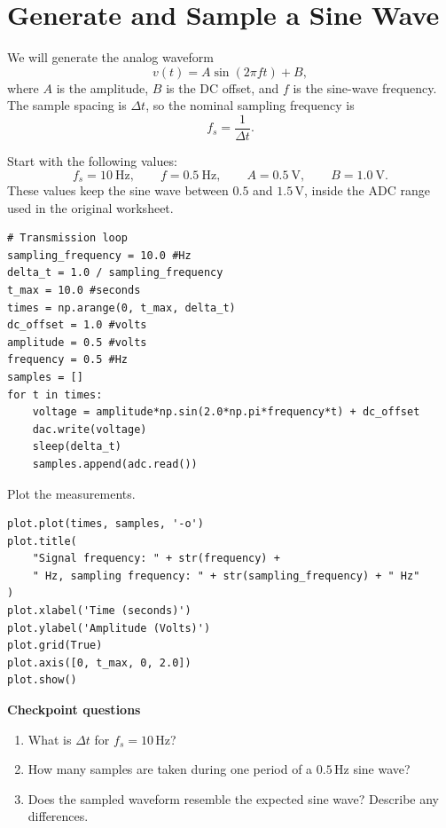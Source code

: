 \documentclass[11pt]{article}
\begin{document}
\section{Generate and Sample a Sine Wave}

We will generate the analog waveform
\begin{equation}
    v(t)=A\sin(2\pi f t)+B,
\end{equation}
where $A$ is the amplitude, $B$ is the DC offset, and $f$ is the sine-wave frequency.  The sample spacing is $\Delta t$, so the nominal sampling frequency is
\begin{equation}
    f_s=\frac{1}{\Delta t}.
\end{equation}

Start with the following values:
\begin{equation*}
    f_s=10\ \mathrm{Hz},\qquad
    f=0.5\ \mathrm{Hz},\qquad
    A=0.5\ \mathrm{V},\qquad
    B=1.0\ \mathrm{V}.
\end{equation*}
These values keep the sine wave between $0.5$ and $1.5\,$V, inside the ADC range used in the original worksheet.

\begin{lstlisting}[style=python]
# Transmission loop
sampling_frequency = 10.0 #Hz
delta_t = 1.0 / sampling_frequency
t_max = 10.0 #seconds
times = np.arange(0, t_max, delta_t)
dc_offset = 1.0 #volts
amplitude = 0.5 #volts
frequency = 0.5 #Hz
samples = []
for t in times:
    voltage = amplitude*np.sin(2.0*np.pi*frequency*t) + dc_offset
    dac.write(voltage)
    sleep(delta_t)
    samples.append(adc.read())
\end{lstlisting}

Plot the measurements.

\begin{lstlisting}[style=python]
plot.plot(times, samples, '-o')
plot.title(
    "Signal frequency: " + str(frequency) +
    " Hz, sampling frequency: " + str(sampling_frequency) + " Hz"
)
plot.xlabel('Time (seconds)')
plot.ylabel('Amplitude (Volts)')
plot.grid(True)
plot.axis([0, t_max, 0, 2.0])
plot.show()
\end{lstlisting}

\textbf{Checkpoint questions}
\begin{enumerate}[label=\alph*)]
    \item What is $\Delta t$ for $f_s=10\,$Hz?
    \item How many samples are taken during one period of a $0.5\,$Hz sine wave?
    \item Does the sampled waveform resemble the expected sine wave? Describe any differences.
\end{enumerate}
\end{document}
